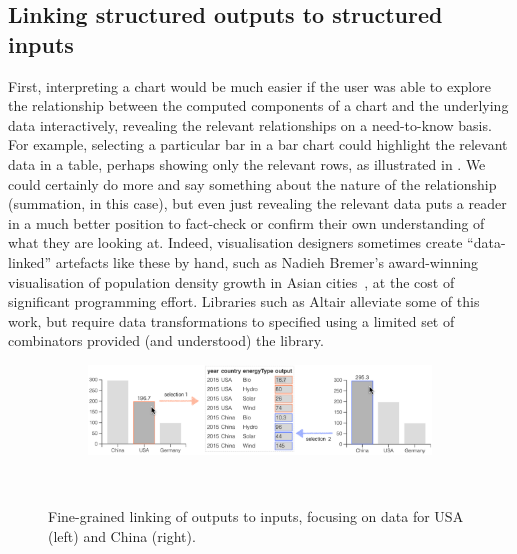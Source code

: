 \subsection{Linking structured outputs to structured inputs}
\label{sec:introduction:data-linking}
First, interpreting a chart would be much easier if the user was able to explore the relationship between the computed components of a chart and the underlying data interactively, revealing the relevant relationships on a need-to-know basis. For example, selecting a particular bar in a bar chart could highlight the relevant data in a table, perhaps showing only the relevant rows, as illustrated in . We could certainly do more and say something about the nature of the relationship (summation, in this case), but even just revealing the relevant data puts a reader in a much better position to fact-check or confirm their own understanding of what they are looking at. Indeed, visualisation designers sometimes create ``data-linked'' artefacts like these by hand, such as Nadieh Bremer's award-winning visualisation of population density growth in Asian cities~\cite{bremer15}, at the cost of significant programming effort. Libraries such as Altair \cite{vanderPlas18} alleviate some of this work, but require data transformations  to specified using a limited set of combinators provided (and understood) the library.

\begin{figure}
   \begin{subfigure}[b]{0.99\textwidth}
      \centering
      {\includegraphics[scale=0.55]{fig/example/data-linking-merged.png}}
   \end{subfigure}\\
   \vspace{2mm}
   \begin{subfigure}{0.65\textwidth}
      \small
      
   \end{subfigure}
   \caption{Fine-grained linking of outputs to inputs, focusing on data for USA (left) and China (right).}
   \label{fig:introduction:data-linking}
\end{figure}

